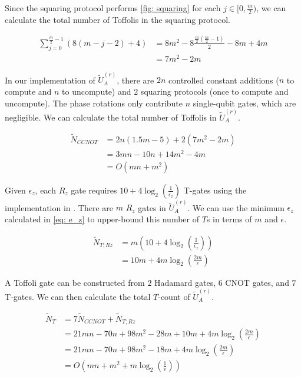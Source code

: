 Since the squaring protocol performs \ref{fig: squaring} for each $j \in [0, \frac{m}{2})$, we can calculate the total number of Toffolis in the squaring protocol.

\begin{equation}
    \begin{split}
        \sum_{j = 0}^{\frac{m}{2} - 1} (8(m - j - 2) + 4) &= 8m^2 - 8\frac{\frac{m}{2}(\frac{m}{2} - 1)}{2} - 8m + 4m \\
        &= 7m^2 - 2m
    \end{split}
\end{equation}

In our implementation of $\tilde{U}_A^{(r)}$, there are $2n$ controlled constant additions ($n$ to compute and $n$ to uncompute) and $2$ squaring protocols (once to compute and uncompute). The phase rotations only contribute $n$ single-qubit gates, which are negligible. We can calculate the total number of Toffolis in $\tilde{U}_A^{(r)}$.

\begin{equation}
    \begin{split}
        \tilde{N}_{CCNOT} &= 2n(1.5m - 5) + 2(7m^2 - 2m) \\
        &= 3mn - 10n + 14m^2 - 4m \\
        &= O(mn + m^2) \label{eq: toffolis}
    \end{split}
\end{equation}

Given $\epsilon_z$, each $R_z$ gate requires $10 + 4\log_2(\frac{1}{\epsilon_z})$ T-gates using the implementation in \cite{Rz}. There are $m$ $R_z$ gates in $\tilde{U}_A^{(r)}$. We can use the minimum $\epsilon_z$ calculated in \eqref{eq: e_z} to upper-bound this number of $T$s in terms of $m$ and $\epsilon$.

\begin{equation}
    \begin{split}
        \tilde{N}_{T; Rz} &= m(10 + 4\log_2(\frac{1}{\epsilon_z})) \\
        &= 10m + 4m\log_2(\frac{2m}{\epsilon})
    \end{split}
\end{equation}

A Toffoli gate can be constructed from $2$ Hadamard gates, $6$ CNOT gates, and $7$ T-gates. We can then calculate the total $T$-count of $\tilde{U}_A^{(r)}$.

\begin{equation}
    \begin{split}
        \tilde{N}_{T} &= 7\tilde{N}_{CCNOT} + \tilde{N}_{T; Rz} \\
        &= 21mn - 70n + 98m^2 - 28m + 10m + 4m\log_2(\frac{2m}{\epsilon}) \\
        &= 21mn - 70n + 98m^2 - 18m + 4m\log_2(\frac{2m}{\epsilon}) \\
        &= O(mn + m^2 + m\log_2(\frac{1}{\epsilon})) \label{eq: Ts_mneps}
    \end{split}
\end{equation}

